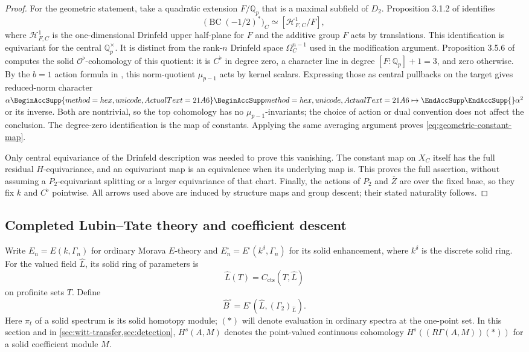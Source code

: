 \documentclass[11pt]{article}
\numberwithin{equation}{section}
\theoremstyle{definition}
\theoremstyle{remark}
\newcommand{\Q}{\mathbb Q}
\newcommand{\cO}{\mathcal O}
\newcommand{\cts}{\mathrm{cts}}
\let\UnicodeOriginalMapsto\mapsto
\DeclareRobustCommand{\mapsto}{
  \BeginAccSupp{method=hex,unicode,ActualText=21A6}
  \UnicodeOriginalMapsto\EndAccSupp{}}
\begin{document}
\begin{proof}
For the geometric statement, take a quadratic extension $F/\Q_p$ that
is a maximal subfield of $D_2$.  Proposition 3.1.2 of \cite{BMR2026}
identifies
\[
 \bigl(\operatorname{BC}(-1/2)^*\bigr)_C
 \simeq[\mathcal H^1_{F,C}/F],
\]
where $\mathcal H^1_{F,C}$ is the one-dimensional Drinfeld upper
half-plane for $F$ and the additive group $F$ acts by translations.
This identification is equivariant for the central $\Q_p^{\times}$.
It is distinct from the rank-$n$ Drinfeld space
$\Omega_C^{n-1}$ used in the modification argument.
Proposition 3.5.6 of \cite{BMR2026} computes the solid
$\cO^{\flat}$-cohomology of this quotient: it is $C^{\flat}$ in degree
zero, a character line in degree $[F:\Q_p]+1=3$, and zero otherwise.
By the $b=1$ action formula in , this norm-quotient
$\mu_{p-1}$ acts by kernel scalars.  Expressing those as central
pullbacks on the target gives reduced-norm character
$\alpha\mapsto\alpha^2$ or its inverse.  Both are nontrivial, so the
top cohomology has no $\mu_{p-1}$-invariants; the choice of action or
dual convention does not affect the conclusion.
The degree-zero identification is the map of constants.  Applying the
same averaging argument proves \eqref{eq:geometric-constant-map}.

Only central equivariance of the Drinfeld description was needed to
prove this vanishing.  The constant map on $X_C$ itself has the full
residual $H$-equivariance, and an equivariant map is an equivalence when
its underlying map is.  This proves the full assertion, without assuming
a $P_2$-equivariant splitting or a larger equivariance of that chart.
Finally, the actions of $P_2$ and $\overline Z$ are over the fixed base,
so they fix $k$ and $C^{\flat}$ pointwise.  All arrows used above are
induced by structure maps and group descent; their stated naturality
follows.
\end{proof}

\subsection{Completed Lubin--Tate theory and coefficient descent}

Write $E_n=E(k,\Gamma_n)$ for ordinary Morava $E$-theory and
$E_n^{\square}=E^{\square}(k^{\delta},\Gamma_n)$ for its solid
enhancement, where $k^{\delta}$ is the discrete solid ring.  For the
valued field $\widehat L$, its solid ring of parameters is
\[
 \widehat L(T)=C_{\cts}(T,\widehat L)
\]
on profinite sets $T$.  Define
\[
 \widehat B^{\square}
   =E^{\square}(\widehat L,(\Gamma_2)_{\widehat L}).
\]
Here $\pi_t$ of a solid spectrum is its solid homotopy module; $(*)$
will denote evaluation in ordinary spectra at the one-point set.
In this section and in \cref{sec:witt-transfer,sec:detection},
$H^s(A,M)$ denotes the point-valued continuous cohomology
$H^s((R\Gamma(A,M))(*))$ for a solid coefficient module $M$.
\end{document}
